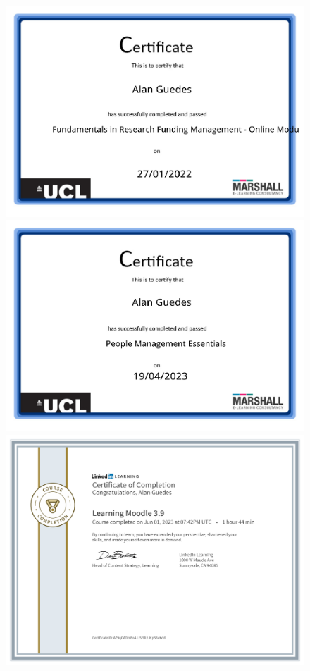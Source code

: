\documentclass[10pt,a4paper,sans,colorlinks]{moderncv}
\begin{document}
\begin{figure}
    \includegraphics[align=t,width=\textwidth,height=0.18\paperheight, keepaspectratio=true]{certificates/ucl-training/Fundamentals_in_Research_Funding.pdf}
    \centering \includegraphics[align=t,width=\textwidth,height=0.18\paperheight, keepaspectratio=true]{certificates/ucl-training/People_Management_Essentials.pdf}
    \includegraphics[align=t,width=\textwidth,height=0.18\paperheight, keepaspectratio=true]{certificates/ucl-training/Moodle39.pdf}
\end{figure}
\end{document}
